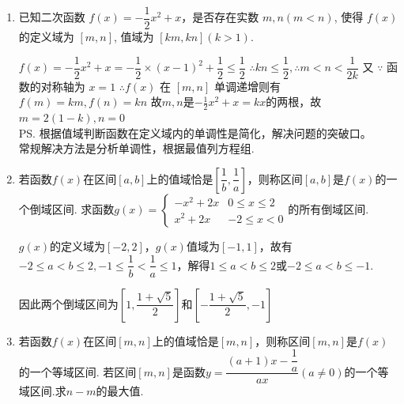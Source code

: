\begin{enumerate}
    \item 已知二次函数 $f(x)=-\dfrac{1}{2} x^2+x$，是否存在实数 $m, n(m<n)$, 使得 $f(x)$ 的定义域为 $[m, n]$, 值域为 $[k m, k n](k>1)$.
    \begin{jieda}
    $f(x)=-\dfrac{1}{2} x^2+x=-\dfrac{1}{2} \times(x-1)^2+\dfrac{1}{2} \leq \dfrac{1}{2}$
    $\therefore k n \leq \dfrac{1}{2}, \therefore m<n<\dfrac{1}{2k}$
    又 $\because$ 函数的对称轴为 $x=1$
    $\therefore f(x)$ 在 $[m, n]$ 单调递增则有 $f(m)=k m, f(n)=k n$
    故$m, n$是$-\frac{1}{2}x^2 + x = kx$的两根，故$m = 2(1-k), n = 0$ \\
    \ps 根据值域判断函数在定义域内的单调性是简化，解决问题的突破口。\\
    常规解决方法是分析单调性，根据最值列方程组.
    \end{jieda}
    \item 若函数$f(x)$在区间$[a, b]$上的值域恰是$\left[\dfrac{1}{b}, \dfrac{1}{a}\right]$，则称区间$[a, b]$是$f(x)$的一个倒域区间. 求函数$g(x) = \left \{ \begin{array}{ll}
        -x^2+2x & 0 \leq x \leq 2 \\
        x^2 + 2x & -2 \leq x < 0
    \end{array}\right.$的所有倒域区间.
    \begin{jieda}
        $g(x)$的定义域为$[-2, 2]$，$g(x)$值域为$[-1, 1]$，故有$-2 \leq a < b \leq 2, -1 \leq \dfrac{1}{b} < \dfrac{1}{a} \leq 1$，解得$1 \leq a < b \leq 2$或$-2 \leq a < b \leq -1$.
        因此两个倒域区间为$\left[1, \dfrac{1+\sqrt{5}}{2}\right]$和$\left[-\dfrac{1+\sqrt{5}}{2}, -1\right]$
    \end{jieda}
    \item 若函数$f(x)$在区间$[m, n]$上的值域恰是$[m, n]$，则称区间$[m, n]$是$f(x)$的一个等域区间. 若区间$[m,n]$是函数$y = \dfrac{(a+1)x - \dfrac{1}{a}}{ax}(a \neq 0)$的一个等域区间.求$n-m$的最大值.

\end{enumerate}
